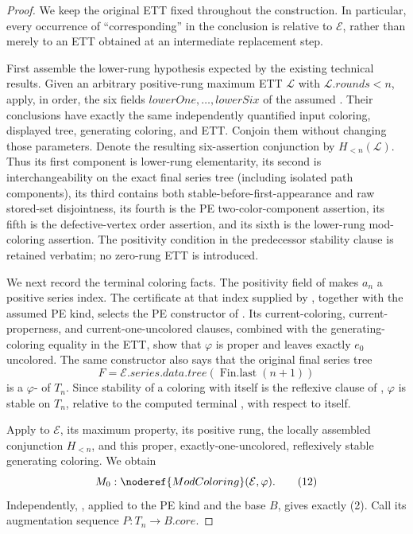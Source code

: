 \begin{proof}
We keep the original ETT fixed throughout the construction.  In particular,
every occurrence of ``corresponding'' in the conclusion is relative to
\(\mathcal E\), rather than merely to an ETT obtained at an intermediate
replacement step.

First assemble the lower-rung hypothesis expected by the existing technical
results.  Given an arbitrary positive-rung maximum ETT \(\mathcal L\) with
\(\mathcal L.\mathit{rounds}<n\), apply, in order, the six fields
\(\mathit{lowerOne},\ldots,\mathit{lowerSix}\) of the assumed
.  Their conclusions have exactly the
same independently quantified input coloring, displayed tree, generating
coloring, and ETT.  Conjoin them without changing those parameters.  Denote
the resulting six-assertion conjunction by \(H_{<n}(\mathcal L)\).  Thus its
first component is lower-rung elementarity, its second is interchangeability
on the exact final series tree (including isolated path components), its
third contains both stable-before-first-appearance and raw stored-set
disjointness, its fourth is the PE two-color-component assertion, its fifth
is the defective-vertex order assertion, and its sixth is the lower-rung
mod-coloring assertion.  The positivity condition in the predecessor
stability clause is retained verbatim; no zero-rung ETT is introduced.

We next record the terminal coloring facts.  The positivity field of
 makes \(a_n\) a positive series index.  The
certificate at that index supplied by , together
with the assumed PE kind, selects the PE constructor of
.  Its current-coloring, current-properness, and
current-one-uncolored clauses, combined with the generating-coloring equality
in the ETT, show that \(\varphi\) is proper and leaves exactly \(e_0\)
uncolored.  The same constructor also says that the original final series
tree
\[
 F=\mathcal E.\mathit{series.data.tree}
       (\operatorname{Fin.last}(n+1))                            \tag{11}
\]
is a \(\varphi\)- of \(T_n\).  Since stability of
a coloring with itself is the reflexive clause of , \(\varphi\)
is stable on \(T_n\), relative to the computed terminal
, with respect to itself.

Apply  to \(\mathcal E\), its maximum property, its positive rung,
the locally assembled conjunction \(H_{<n}\), and this proper,
exactly-one-uncolored, reflexively stable generating coloring.  We obtain
\[
                         M_0:\noderef{ModColoring}(\mathcal E,\varphi).
                                                                    \tag{12}
\]
Independently, , applied to the PE
kind and the base \(B\), gives exactly (2).  Call its augmentation sequence
\(P:T_n\longrightarrow B.\mathit{core}\).


\end{proof}
